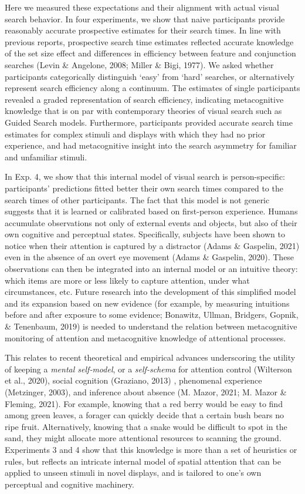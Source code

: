 \documentclass[12pt,twoside]{reedthesis}
\begin{document}
Here we measured these expectations and their alignment with actual visual search behavior. In four experiments, we show that naive participants provide reasonably accurate prospective estimates for their search times. In line with previous reports, prospective search time estimates reflected accurate knowledge of the set size effect and differences in efficiency between feature and conjunction searches (Levin \& Angelone, 2008; Miller \& Bigi, 1977). We asked whether participants categorically distinguish `easy' from `hard' searches, or alternatively represent search efficiency along a continuum. The estimates of single participants revealed a graded representation of search efficiency, indicating metacognitive knowledge that is on par with contemporary theories of visual search such as Guided Search models. Furthermore, participants provided accurate search time estimates for complex stimuli and displays with which they had no prior experience, and had metacognitive insight into the search asymmetry for familiar and unfamiliar stimuli.

In Exp. 4, we show that this internal model of visual search is person-specific: participants' predictions fitted better their own search times compared to the search times of other participants. The fact that this model is not generic suggests that it is learned or calibrated based on first-person experience. Humans accumulate observations not only of external events and objects, but also of their own cognitive and perceptual states. Specifically, subjects have been shown to notice when their attention is captured by a distractor (Adams \& Gaspelin, 2021) even in the absence of an overt eye movement (Adams \& Gaspelin, 2020). These observations can then be integrated into an internal model or an intuitive theory: which items are more or less likely to capture attention, under what circumstances, etc. Future research into the development of this simplified model and its expansion based on new evidence (for example, by measuring intuitions before and after exposure to some evidence; Bonawitz, Ullman, Bridgers, Gopnik, \& Tenenbaum, 2019) is needed to understand the relation between metacognitive monitoring of attention and metacognitive knowledge of attentional processes.

This relates to recent theoretical and empirical advances underscoring the utility of keeping a \emph{mental self-model}, or a \emph{self-schema} for attention control (Wilterson et al., 2020), social cognition (Graziano, 2013) , phenomenal experience (Metzinger, 2003), and inference about absence (M. Mazor, 2021; M. Mazor \& Fleming, 2021). For example, knowing that a red berry would be easy to find among green leaves, a forager can quickly decide that a certain bush bears no ripe fruit. Alternatively, knowing that a snake would be difficult to spot in the sand, they might allocate more attentional resources to scanning the ground. Experiments 3 and 4 show that this knowledge is more than a set of heuristics or rules, but reflects an intricate internal model of spatial attention that can be applied to unseen stimuli in novel displays, and is tailored to one's own perceptual and cognitive machinery.
\end{document}
